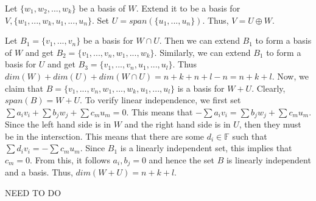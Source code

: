 \documentclass{report}
\begin{document}
\begin{myproof}
    Let $\{w_1, w_2, ..., w_k\}$ be a basis of $W$. Extend it to be a basis for $V, \{w_1, ..., w_k, u_1, ..., u_n\}$. Set $U = span(\{u_1, ..., u_n\})$. Thus, $V = U \oplus W$.
\end{myproof}

\begin{myproof}
    Let $B_1 = \{v_1, ..., v_n\}$ be a basis for $W\cap U$. Then we can extend $B_1$ to form a basis of $W$ and get $B_2 = \{v_1, ..., v_n, w_1, ..., w_k\}$. Similarly, we can extend $B_1$ to form a basis for $U$ and get $B_3 = \{v_1, ..., v_n, u_1, ..., u_l\}$. Thus $dim(W) + dim(U) + dim(W \cap U) = n + k + n + l - n = n+k+l$. Now, we claim that $B = \{v_1, ..., v_n, w_1, ..., w_k, u_1, ..., u_l\}$ is a basis for $W+U$. Clearly, $span(B) = W+U$. To verify linear independence, we first set $\sum a_i v_i + \sum b_j w_j + \sum c_m u_m = 0$. This means that $-\sum a_i v_i = \sum b_j w_j + \sum c_m u_m$. Since the left hand side is in $W$ and the right hand side is in $U$, then they must  be in the intersction. This means that there are some $d_i \in \mathbb{F}$ such that $\sum d_i v_i = -\sum c_m u_m$. Since $B_1$ is a linearly independent set, this implies that $c_m = 0$. From this, it follows $a_i, b_j = 0$ and hence the set $B$ is linearly independent and a basis. Thus, $dim(W+U) = n+k+l$. 
\end{myproof}


\begin{myproof}
    NEED TO DO
\end{myproof}

\end{document}
